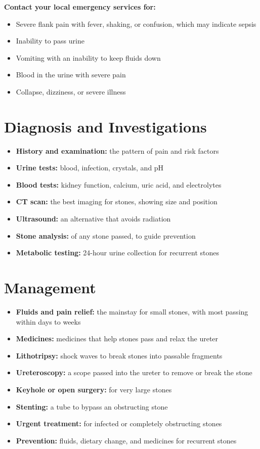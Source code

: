 \textbf{Contact your local emergency services for:}
\begin{itemize}
    \item Severe flank pain with fever, shaking, or confusion, which may indicate sepsis
    \item Inability to pass urine
    \item Vomiting with an inability to keep fluids down
    \item Blood in the urine with severe pain
    \item Collapse, dizziness, or severe illness
\end{itemize}

\section*{Diagnosis and Investigations}
\begin{itemize}
    \item \textbf{History and examination:} the pattern of pain and risk factors
    \item \textbf{Urine tests:} blood, infection, crystals, and pH
    \item \textbf{Blood tests:} kidney function, calcium, uric acid, and electrolytes
    \item \textbf{CT scan:} the best imaging for stones, showing size and position
    \item \textbf{Ultrasound:} an alternative that avoids radiation
    \item \textbf{Stone analysis:} of any stone passed, to guide prevention
    \item \textbf{Metabolic testing:} 24-hour urine collection for recurrent stones
\end{itemize}

\section*{Management}
\begin{itemize}
    \item \textbf{Fluids and pain relief:} the mainstay for small stones, with most passing within days to weeks
    \item \textbf{Medicines:} medicines that help stones pass and relax the ureter
    \item \textbf{Lithotripsy:} shock waves to break stones into passable fragments
    \item \textbf{Ureteroscopy:} a scope passed into the ureter to remove or break the stone
    \item \textbf{Keyhole or open surgery:} for very large stones
    \item \textbf{Stenting:} a tube to bypass an obstructing stone
    \item \textbf{Urgent treatment:} for infected or completely obstructing stones
    \item \textbf{Prevention:} fluids, dietary change, and medicines for recurrent stones
\end{itemize}


